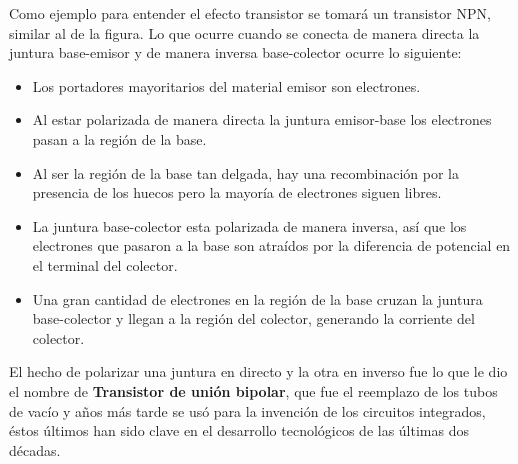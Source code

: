 Como ejemplo para entender el efecto transistor se tomará un transistor NPN, similar al de la figura. Lo que ocurre cuando se conecta de manera directa la juntura base-emisor y de manera inversa base-colector ocurre lo siguiente:
\begin{itemize}
    \item Los portadores mayoritarios del material emisor son electrones. 
    \item Al estar polarizada de manera directa la juntura emisor-base los electrones pasan a la región de la base.
    \item Al ser la región de la base tan delgada, hay una recombinación por la presencia de los huecos pero la mayoría de electrones siguen libres.
    \item La juntura base-colector esta polarizada de manera inversa, así que los electrones que pasaron a la base son atraídos por la diferencia de potencial en el terminal del colector.
    \item Una gran cantidad de electrones en la región de la base cruzan la juntura base-colector y llegan a la región del colector, generando la corriente del colector.
\end{itemize}
El hecho de polarizar una juntura en directo y la otra en inverso fue lo que le dio el nombre de \textbf{Transistor de unión bipolar}, que fue el reemplazo de los tubos de vacío y años más tarde se usó para la invención de los circuitos integrados, éstos últimos han sido clave en el desarrollo tecnológicos de las últimas dos décadas. 
